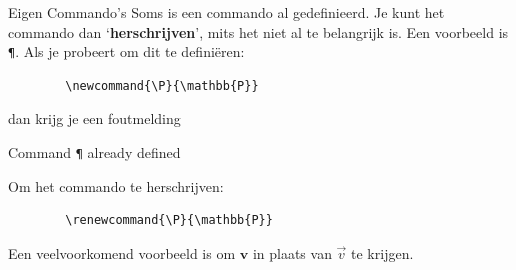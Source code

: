 \begin{frame}[fragile]{Eigen Commando's}
    Soms is een commando al gedefinieerd. 
    Je kunt het commando dan `\textbf{herschrijven}', mits het niet al te belangrijk is. 
    Een voorbeeld is \texttt{\P}. Als je probeert om dit te definiëren:
    \begin{verbatim}
        \newcommand{\P}{\mathbb{P}}
    \end{verbatim}
    dan krijg je een foutmelding
    \begin{tcolorbox}[boxrule = 0.5pt, colback=red!25!white]
        Command \texttt{\P} already defined
    \end{tcolorbox}
    \pause
    Om het commando te herschrijven:
    \begin{verbatim}
        \renewcommand{\P}{\mathbb{P}}
    \end{verbatim}
    \pause
    Een veelvoorkomend voorbeeld is \texttt{\renewcommand{\vec}{\mathbf}} om 
    $\mathbf{v}$ in plaats van $\vec{v}$ te krijgen. 
\end{frame}